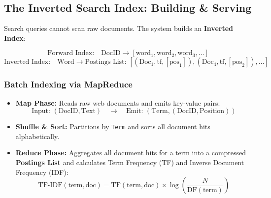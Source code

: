 \documentclass[10pt,journal,compsoc,onecolumn]{IEEEtran}
\begin{document}
\subsection{The Inverted Search Index: Building \& Serving}
Search queries cannot scan raw documents. The system builds an \textbf{Inverted Index}:

\begin{equation}
    \text{Forward Index:} \quad \text{DocID} \longrightarrow [\text{word}_1, \text{word}_2, \text{word}_3, \dots]
\end{equation}
\begin{equation}
    \text{Inverted Index:} \quad \text{Word} \longrightarrow \text{Postings List: } [(\text{Doc}_1, \text{tf}, [\text{pos}_1]), (\text{Doc}_4, \text{tf}, [\text{pos}_2]), \dots]
\end{equation}

\subsubsection{Batch Indexing via MapReduce}
\begin{itemize}
    \item \textbf{Map Phase:} Reads raw web documents and emits key-value pairs:
    \begin{equation}
        \text{Input: } (\text{DocID}, \text{Text}) \quad \longrightarrow \quad \text{Emit: } (\text{Term}, (\text{DocID}, \text{Position}))
    \end{equation}
    \item \textbf{Shuffle \& Sort:} Partitions by \texttt{Term} and sorts all document hits alphabetically.
    \item \textbf{Reduce Phase:} Aggregates all document hits for a term into a compressed \textbf{Postings List} and calculates Term Frequency (TF) and Inverse Document Frequency (IDF):
    \begin{equation}
        \text{TF-IDF}(\text{term}, \text{doc}) = \text{TF}(\text{term}, \text{doc}) \times \log\left(\frac{N}{\text{DF}(\text{term})}\right)
    \end{equation}
\end{itemize}
\end{document}
